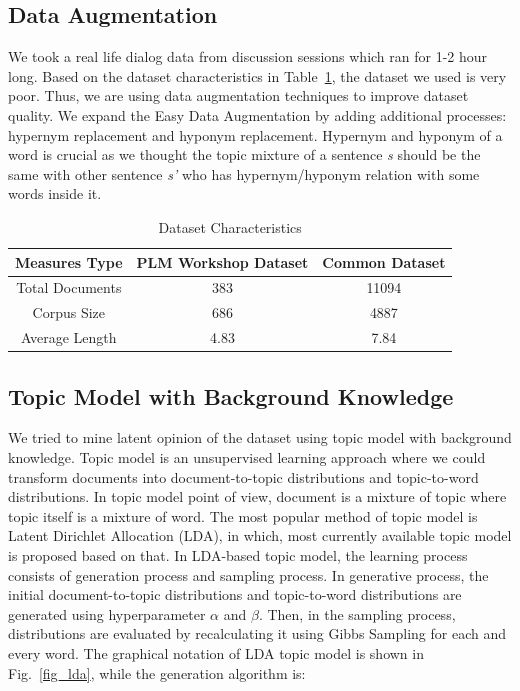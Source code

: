 \documentclass[10pt, conference, compsocconf]{IEEEtran}
\begin{document}
\subsection{Data Augmentation}
We took a real life dialog data from discussion sessions which ran for 1-2 hour long. Based on the dataset characteristics in Table~\ref{table 1: dataset characteristics}, the dataset we used is very poor. Thus, we are using data augmentation techniques to improve dataset quality. We expand the Easy Data Augmentation\cite{b7} by adding additional processes: hypernym replacement and hyponym replacement. Hypernym and hyponym of a word is crucial as we thought the topic mixture of a sentence {\it s} should be the same with other sentence {\it s'} who has hypernym/hyponym relation with some words inside it.

\begin{table}[h]
\caption{Dataset Characteristics}
\begin{tabular}{|c|c|c|}
\hline
\textbf{Measures Type}&\textbf{PLM Workshop Dataset}&\textbf{Common Dataset \cite{b6}}\\
\hline
Total Documents&383&11094  \\
\hline
Corpus Size&686&4887 \\
\hline
Average Length&4.83&7.84 \\
\hline
\end{tabular}
\label{table 1: dataset characteristics}
\end{table}

\subsection{Topic Model with Background Knowledge}
We tried to mine latent opinion of the dataset  using topic  model with background knowledge. Topic model is an unsupervised learning approach where we could transform documents into document-to-topic distributions and topic-to-word distributions. In topic model point of view, document is a mixture of topic where topic itself is a mixture of word. The most popular method of topic model is Latent Dirichlet Allocation (LDA)\cite{b8}, in which, most currently available topic model is proposed based on that. In LDA-based topic model, the learning process consists of generation process and sampling process. In generative process, the initial document-to-topic distributions and topic-to-word distributions are generated using hyperparameter $\alpha$ and $\beta$. Then, in the sampling process, distributions are evaluated by recalculating it using Gibbs Sampling for each and every word. The graphical notation of LDA topic model is shown in Fig.~\ref{fig_lda}, while the generation algorithm is:
\bigskip
\end{document}
